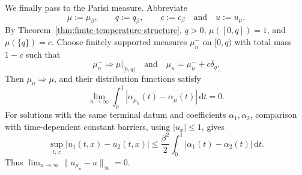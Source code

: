 \documentclass[10pt]{amsart}
\theoremstyle{definition}
\theoremstyle{remark}
\numberwithin{equation}{section}
\newcommand{\1}{\mathbf 1}
\newcommand{\dd}{\,\mathrm d}
\begin{document}
We finally pass to the Parisi measure.  Abbreviate
\begin{equation*}
 \mu:=\mu_\beta,\qquad q:=q_\beta,\qquad c:=c_\beta
 \quad\text{and}\quad u:=u_\mu.
\end{equation*}
By Theorem~\ref{thm:finite-temperature-structure}, $q>0$, $\mu([0,q])=1$, and $\mu(\{q\})=c$.  Choose finitely supported measures $\mu_n^-$ on $[0,q)$ with total mass $1-c$ such that
\begin{equation*}
 \mu_n^-\Longrightarrow\mu|_{[0,q)}
 \quad\text{and}\quad \mu_n=\mu_n^-+c\delta_q.
\end{equation*}
Then $\mu_n\Longrightarrow\mu$, and their distribution functions satisfy
\begin{equation}
 \lim_{n\to\infty}\int_0^1|\alpha_{\mu_n}(t)
 -\alpha_\mu(t)|\dd t=0.
 \label{eq:app-ft-alpha-approximation}
\end{equation}
For solutions with the same terminal datum and coefficients $\alpha_1,\alpha_2$, comparison with time-dependent constant barriers, using $|u_x|\leq1$, gives
\begin{equation}
 \sup_{t,x}|u_1(t,x)-u_2(t,x)|
 \leq\frac{\beta^2}{2}
 \int_0^1|\alpha_1(t)-\alpha_2(t)|\dd t.
 \label{eq:app-ft-PDE-stability}
\end{equation}
Thus $\lim_{n\to\infty}\|u_{\mu_n}-u\|_\infty=0$.
\end{document}
